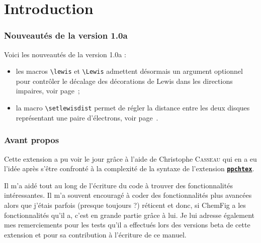 \documentclass[10pt]{article}
\newcommand\CF{{\ECFAugie ChemFig}\xspace}
\begin{document}
\parindent0pt\pagestyle{plain}
\tableofcontents
\parskip\medskipamount
\vspace{2cm}

\part{Introduction}
\section{Nouveautés de la version 1.0a}
Voici les nouveautés de la version 1.0a :
\begin{itemize}
	\item les macros \verb-\lewis- et \verb-\Lewis- admettent désormais un argument optionnel pour contrôler le décalage des décorations de Lewis dans les directions impaires, voir page~\pageref{opt.lewis};
	\item la macro \verb-\setlewisdist- permet de régler la distance entre les deux disques représentant une paire d'électrons, voir page~\pageref{setlewisdist}.
\end{itemize}

\section{Avant propos}
Cette extension a pu voir le jour grâce à l'aide de Christophe \textsc{Casseau} qui en a eu l'idée après s'être confronté à la complexité de la syntaxe de l'extension \href{http://www.ctan.org/tex-archive/help/Catalogue/entries/ppchtex.html}{\texttt{\textbf{ppchtex}}}.

Il m'a aidé tout au long de l'écriture du code à trouver des fonctionnalités intéressantes. Il m'a souvent encouragé à coder des fonctionnalités plus avancées alors que j'étais parfois (presque toujours ?) réticent et donc, si \CF a les fonctionnalités qu'il a, c'est en grande partie grâce à lui. Je lui adresse également mes remerciements pour les tests qu'il a effectués lors des versions beta de cette extension et pour sa contribution à l'écriture de ce manuel.\medskip
\end{document}
